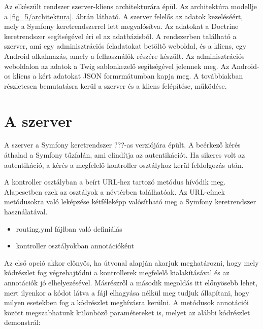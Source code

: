﻿Az elkészült rendszer szerver-kliens architekturára épül.
Az architektúra modellje a \ref{fig_5/architektura}. ábrán látható. 
A szerver felelős az adatok kezeléséért, mely a Symfony keretrendszerrel lett megvalósítva. 
Az adatokat a Doctrine keretrendszer segítségével éri el az adatbázisból. 
A rendszerben található a szerver, ami egy adminisztrációs feladatokat betöltő weboldal, és a kliens, egy Android alkalmazás, amely a felhasználók részére készült. 
Az adminisztrációs weboldalon az adatok a Twig sablonkezelő segítségével jelennek meg. 
Az Android-os kliens a kért adatokat JSON formrmátumban kapja meg. 
A továbbiakban részletesen bemutatásra kerül a szerver és a kliens felépítése, működése. 


\section{A szerver}
\label{szerverfelepites}

A szerver a Symfony keretrendszer ???-as verziójára épült. 
A beérkező kérés áthalad a Symfony tűzfalán, ami elindítja az autentikációt. 
Ha sikeres volt az autentikáció, a kérés a megfelelő kontroller osztályhoz kerül feldolgozás után. 


A kontroller osztályban a beírt URL-hez tartozó metódus hívódik meg. 
Alapesetben ezek az osztályok a  névtérben találhatóak. 
Az URL-címek metódusokra való leképzése kétféleképp valósítható meg a Symfony keretrendszer használatával. 

\begin{itemize}
	\item routing.yml fájlban való definiálás
	\item kontroller osztályokban annotációként
\end{itemize}

Az első opció akkor előnyös, ha útvonal alapján akarjuk meghatározni, hogy mely kódrészlet fog végrehajtódni a kontrollerek megfelelő kialakításával és az annotációk jó elhelyezésével. 
Másrészről a második megoldás itt előnyösebb lehet, mert ilyenkor a kódot látva a fájl elhagyása nélkül meg tudjuk állapítani, hogy milyen esetekben fog a kódrészlet meghívásra kerülni. 
A metódusok annotációi között megszabhatunk különböző paramétereket is, melyet az alábbi kódrészlet demonstrál:


